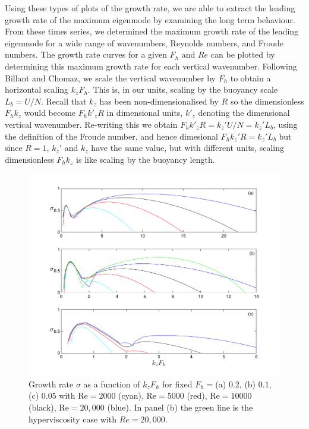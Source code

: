 Using these types of plots of the growth rate, we are able to extract the leading growth rate of the maximum eigenmode by examining the long term behaviour. From these times series, we determined the maximum growth rate of the leading eigenmode for a wide range of wavenumbers, Reynolds numbers, and Froude numbers. The growth rate curves for a given $F_{h}$ and $Re$ can be plotted by determining this maximum growth rate for each vertical wavenumber. Following Billant and Chomaz\cite{bc2000c}, we scale the vertical wavenumber by $F_{h}$ to obtain a horizontal scaling $k_{z}F_{h}$.  This is, in our units, scaling by the buoyancy scale $L_{b} = U/N$. Recall that $k_{z}$ has been non-dimensionalised by $R$ so the dimensionless $F_{h}k_{z}$ would become $F_{h}k'_{z}R$ in dimensional units, $k'_{z}$ denoting the dimensional vertical wavenumber. Re-writing this we obtain $F_{h}k'_{z}R=k_{z}'U/N=k_{z}'L_{b}$, using the definition of the Froude number, and hence dimesional $F_{h}k_{z}'R=k_{z}'L_{b}$ but since $R=1$, $k_{z}'$ and $k_{z}$ have the same value, but with different units, scaling dimensionless $F_{h}k_{z}$ is like scaling by the buoyancy length. 

\begin{figure}
\begin{center}
\includegraphics[width=\textwidth]{fixed_froude_varying_reynolds}
\caption{Growth rate $\sigma$ as a function of $k_{z}F_{h}$ for fixed $F_{h}=$(a) $0.2$, (b) $0.1$, (c) $0.05$ with Re$=2000$ (cyan), Re$=5000$ (red), Re$=10000$ (black), Re$=20{,}000$ (blue). In panel (b) the green line is the hyperviscosity case with $Re=20{,}000$.}
\label{FixFhVaryRe}
\end{center}
\end{figure}

